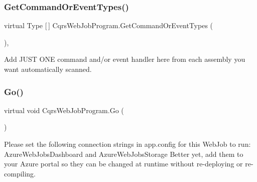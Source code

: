 \subsubsection{\texorpdfstring{Get\+Command\+Or\+Event\+Types()}{GetCommandOrEventTypes()}}
{\footnotesize\ttfamily virtual Type \mbox{[}$\,$\mbox{]} Cqrs\+Web\+Job\+Program.\+Get\+Command\+Or\+Event\+Types (\begin{DoxyParamCaption}{ }\end{DoxyParamCaption})\hspace{0.3cm}{\ttfamily [protected]}, {\ttfamily [virtual]}}



Add J\+U\+ST O\+NE command and/or event handler here from each assembly you want automatically scanned. 

\mbox{\label{classCqrsWebJobProgram_a6a4f817351105cb5482ebb7a30c34ebf_a6a4f817351105cb5482ebb7a30c34ebf}} 
\subsubsection{\texorpdfstring{Go()}{Go()}}
{\footnotesize\ttfamily virtual void Cqrs\+Web\+Job\+Program.\+Go (\begin{DoxyParamCaption}{ }\end{DoxyParamCaption})\hspace{0.3cm}{\ttfamily [virtual]}}

Please set the following connection strings in app.\+config for this Web\+Job to run\+: Azure\+Web\+Jobs\+Dashboard and Azure\+Web\+Jobs\+Storage Better yet, add them to your Azure portal so they can be changed at runtime without re-\/deploying or re-\/compiling. 